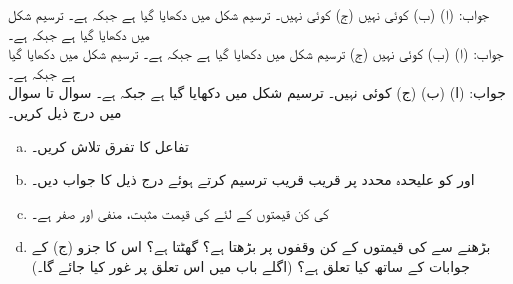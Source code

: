 جواب:\quad
(ا)  (ب) کوئی نہیں (ج) کوئی نہیں۔
ترسیم شکل  میں دکھایا گیا ہے جبکہ  ہے۔
ترسیم شکل  میں دکھایا گیا ہے جبکہ  ہے۔\\
جواب:\quad
(ا)  (ب) کوئی نہیں (ج) 
ترسیم شکل  میں دکھایا گیا ہے جبکہ  ہے۔
ترسیم شکل  میں دکھایا گیا ہے جبکہ  ہے۔\\
جواب:\quad
(ا)  (ب)  (ج) کوئی نہیں۔
ترسیم شکل  میں دکھایا گیا ہے جبکہ  ہے۔
سوال  تا سوال  میں درج ذیل کریں۔
\begin{enumerate}[a.]
\item
تفاعل  کا تفرق  تلاش کریں۔
\item
{} اور  کو علیحدہ محدد پر قریب قریب ترسیم کرتے ہوئے درج ذیل کا جواب دیں۔
\item
{} کی کن قیمتوں کے لئے   کی قیمت  مثبت، منفی اور صفر ہے۔
\item
{} بڑھنے سے  کی قیمتوں کے کن وقفوں پر  بڑھتا ہے؟ گھٹتا ہے؟ اس کا جزو (ج) کے جوابات کے ساتھ کیا تعلق ہے؟ (اگلے باب میں اس تعلق پر غور کیا جائے گا۔)
\end{enumerate} 

